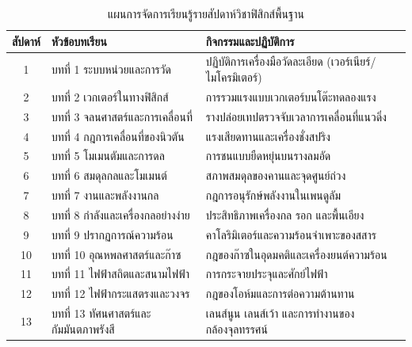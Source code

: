 \begin{table}[H]
\centering
\small
\begin{tabularx}{\textwidth}{c p{5.5cm} X}
\toprule
\textbf{สัปดาห์} & \textbf{หัวข้อบทเรียน} & \textbf{กิจกรรมและปฏิบัติการ} \\
\midrule
1 & บทที่ 1 ระบบหน่วยและการวัด & ปฏิบัติการเครื่องมือวัดละเอียด (เวอร์เนียร์/ไมโครมิเตอร์) \\
2 & บทที่ 2 เวกเตอร์ในทางฟิสิกส์ & การรวมแรงแบบเวกเตอร์บนโต๊ะทดลองแรง \\
3 & บทที่ 3 จลนศาสตร์และการเคลื่อนที่ & รางปล่อยเทปตรวจจับเวลาการเคลื่อนที่แนวดิ่ง \\
4 & บทที่ 4 กฎการเคลื่อนที่ของนิวตัน & แรงเสียดทานและเครื่องชั่งสปริง \\
5 & บทที่ 5 โมเมนตัมและการดล & การชนแบบยืดหยุ่นบนรางลมอัด \\
6 & บทที่ 6 สมดุลกลและโมเมนต์ & สภาพสมดุลของคานและจุดศูนย์ถ่วง \\
7 & บทที่ 7 งานและพลังงานกล & กฎการอนุรักษ์พลังงานในเพนดูลัม \\
8 & บทที่ 8 กำลังและเครื่องกลอย่างง่าย & ประสิทธิภาพเครื่องกล รอก และพื้นเอียง \\
9 & บทที่ 9 ปรากฏการณ์ความร้อน & คาโลริมิเตอร์และความร้อนจำเพาะของสสาร \\
10 & บทที่ 10 อุณหพลศาสตร์และก๊าซ & กฎของก๊าซในอุดมคติและเครื่องยนต์ความร้อน \\
11 & บทที่ 11 ไฟฟ้าสถิตและสนามไฟฟ้า & การกระจายประจุและศักย์ไฟฟ้า \\
12 & บทที่ 12 ไฟฟ้ากระแสตรงและวงจร & กฎของโอห์มและการต่อความต้านทาน \\
13 & บทที่ 13 ทัศนศาสตร์และกัมมันตภาพรังสี & เลนส์นูน เลนส์เว้า และการทำงานของกล้องจุลทรรศน์ \\
\bottomrule
\end{tabularx}
\caption{แผนการจัดการเรียนรู้รายสัปดาห์วิชาฟิสิกส์พื้นฐาน}
\end{table}
